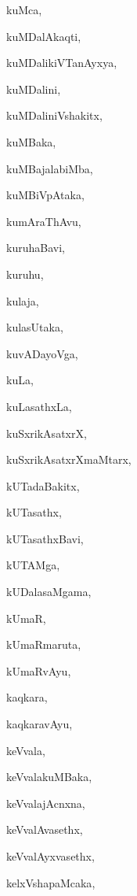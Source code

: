 \begin{multicols}{2}
{kuMca}, \pageref{kuMca}

{kuMDalAkaqti}, \pageref{kuMDalAkaqti}

{kuMDalikiVTanAyxya}, \pageref{kuMDalikiVTanAyxya}

{kuMDalini}, \pageref{kuMDalini}

{kuMDaliniVshakitx}, \pageref{kuMDaliniVshakitx}

{kuMBaka}, \pageref{kuMBaka}

{kuMBajalabiMba}, \pageref{kuMBajalabiMba}

{kuMBiVpAtaka}, \pageref{kuMBiVpAtaka}

{kumAraThAvu}, \pageref{kumAraThAvu}

{kuruhaBavi}, \pageref{kuruhaBavi}

{kuruhu}, \pageref{kuruhu}

{kulaja}, \pageref{kulaja}

{kulasUtaka}, \pageref{kulasUtaka}

{kuvADayoVga}, \pageref{kuvADayoVga}

{kuLa}, \pageref{kuLa}

{kuLasathxLa}, \pageref{kuLasathxLa}

{kuSxrikAsatxrX}, \pageref{kuSxrikAsatxrX}

{kuSxrikAsatxrXmaMtarx}, \pageref{kuSxrikAsatxrXmaMtarx}

{kUTadaBakitx}, \pageref{kUTadaBakitx}

{kUTasathx}, \pageref{kUTasathx}

{kUTasathxBavi}, \pageref{kUTasathxBavi}

{kUTAMga}, \pageref{kUTAMga}

{kUDalasaMgama}, \pageref{kUDalasaMgama}

{kUmaR}, \pageref{kUmaR}

{kUmaRmaruta}, \pageref{kUmaRmaruta}

{kUmaRvAyu}, \pageref{kUmaRvAyu}

{kaqkara}, \pageref{kaqkara}

{kaqkaravAyu}, \pageref{kaqkaravAyu}

{keVvala}, \pageref{keVvala}

{keVvalakuMBaka}, \pageref{keVvalakuMBaka}

{keVvalajAcnxna}, \pageref{keVvalajAcnxna}

{keVvalAvasethx}, \pageref{keVvalAvasethx}

{keVvalAyxvasethx}, \pageref{keVvalAyxvasethx}

{kelxVshapaMcaka}, \pageref{kelxVshapaMcaka}


\end{multicols}
